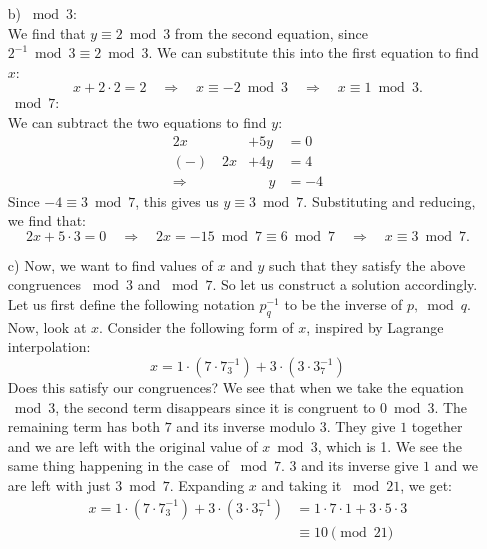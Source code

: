 \documentclass[]{article}
\begin{document}
\begin{qunlist}
{{\begin{enumerate}
\item[b)]
$\bmod 3$:\\
We find that $y\equiv2 \bmod 3$ from the second equation, since $2^{-1} \bmod 3 \equiv 2 \bmod 3$. We can substitute this into the first equation to find $x$:
\[
x + 2\cdot2 = 2 \quad \Rightarrow \quad x \equiv -2 \bmod 3 \quad \Rightarrow \quad x \equiv 1 \bmod 3.
\]
$\bmod 7$:\\
We can subtract the two equations to find $y$:
\begin{align*}
2x &+ 5y &= 0 \\
(-) \quad 2x &+ 4y &= 4 \\
\hline
\Rightarrow \quad  & \quad \ \ y &= -4
\end{align*}
Since $-4 \equiv 3\bmod 7$, this gives us $y \equiv 3\bmod 7$. Substituting and reducing, we find that:
\[ 2x + 5\cdot 3 = 0 \quad \Rightarrow \quad 2x = -15 \bmod 7 \equiv 6 \bmod 7 \quad \Rightarrow \quad x \equiv 3\bmod 7. \]

\item[c)] Now, we want to find values of $x$ and $y$ such that they satisfy the above congruences $\bmod 3$ and $\bmod 7$. So let us construct a solution accordingly. Let us first define the following notation $p^{-1}_q$ to be the inverse of $p, \bmod q$.
Now, look at $x$. Consider the following form of $x$, inspired by Lagrange interpolation:
\[
x = 1 \cdot (7 \cdot 7^{-1}_3) + 3 \cdot (3 \cdot 3^{-1}_7)
\]
Does this satisfy our congruences? We see that when we take the equation $\bmod 3$, the second term disappears since it is congruent to $0 \bmod 3$. The remaining term has both $7$ and its inverse modulo $3$. They give $1$ together and we are left with the original value of $x\bmod 3$, which is 1. We see the same thing happening in the case of $\bmod 7$. $3$ and its inverse give $1$ and we are left with just $3\bmod 7$. Expanding $x$ and taking it $\bmod 21$, we get:
\begin{align*}
x = 1 \cdot (7 \cdot 7^{-1}_3) + 3 \cdot (3 \cdot 3^{-1}_7) &= 1 \cdot 7 \cdot 1 + 3 \cdot 5 \cdot 3 \\
&\equiv \boxed{10 \pmod {21}}
\end{align*}


\end{enumerate}}}
\end{qunlist}
\end{document}
